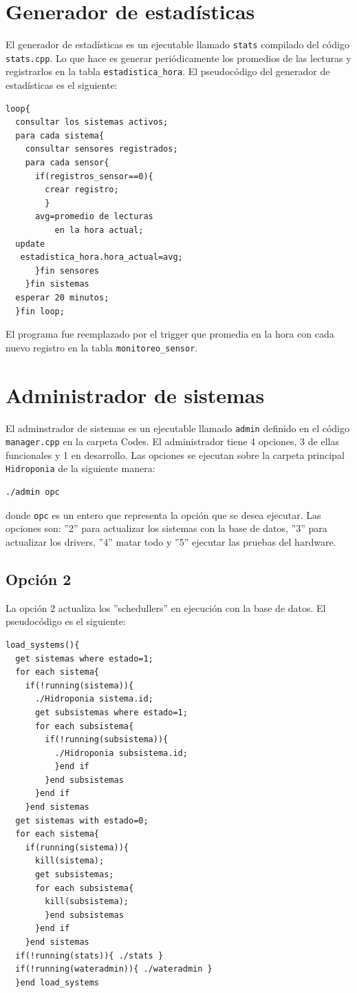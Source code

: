 \documentclass[a4paper,10pt,titlepage]{article}
\begin{document}
\section{Generador de estad\'isticas}
El generador de estad\'isticas es un ejecutable llamado \verb|stats| compilado del c\'odigo \verb|stats.cpp|. Lo que hace es generar peri\'odicamente los 
promedios de las lecturas y registrarlos en la tabla \verb|estadistica_hora|. El pseudoc\'odigo del 
generador de estad\'isticas es el siguiente:
\begin{verbatim}
loop{
  consultar los sistemas activos;
  para cada sistema{
    consultar sensores registrados;
    para cada sensor{
      if(registros_sensor==0){
        crear registro;
        }
      avg=promedio de lecturas 
          en la hora actual;
  update 
   estadistica_hora.hora_actual=avg;
      }fin sensores
    }fin sistemas
  esperar 20 minutos;
  }fin loop;
\end{verbatim}

El programa fue reemplazado por el trigger que promedia en la hora con cada nuevo registro en la tabla \verb|monitoreo_sensor|.

\section{Administrador de sistemas}
El adminstrador de sistemas es un ejecutable llamado \verb|admin| definido en el c\'odigo \verb|manager.cpp| en la carpeta Codes. El administrador tiene 4 opciones, 3 de 
ellas funcionales y 1 en desarrollo. Las opciones se ejecutan sobre la carpeta principal \verb|Hidroponia| de la siguiente manera:

\begin{verbatim}
./admin opc
\end{verbatim}

donde \verb|opc| es un entero que representa la opci\'on que se desea ejecutar. Las opciones son: ''2'' para actualizar los sistemas con la base de datos, ''3'' para 
actualizar 
los 
drivers, ''4'' matar todo y ''5'' ejecutar las pruebas del hardware.

\subsection{Opci\'on 2}
La opci\'on 2 actualiza los ''schedullers'' en ejecuci\'on con la base de datos. El pseudoc\'odigo es el siguiente:

\begin{verbatim}
load_systems(){
  get sistemas where estado=1;
  for each sistema{
    if(!running(sistema)){
      ./Hidroponia sistema.id;
      get subsistemas where estado=1;
      for each subsistema{
        if(!running(subsistema)){
          ./Hidroponia subsistema.id;
          }end if
        }end subsistemas
      }end if
    }end sistemas
  get sistemas with estado=0;
  for each sistema{
    if(running(sistema)){
      kill(sistema);
      get subsistemas;
      for each subsistema{
        kill(subsistema);
        }end subsistemas
      }end if
    }end sistemas
  if(!running(stats)){ ./stats }
  if(!running(wateradmin)){ ./wateradmin }
  }end load_systems
\end{verbatim}
\end{document}
